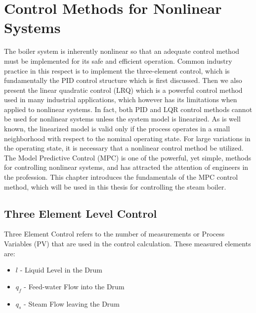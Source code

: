 \chapter{Control Methods for Nonlinear Systems}
    The boiler system is inherently nonlinear so that an adequate control method must be implemented for its safe and efficient operation.
    Common industry practice in this respect is to implement the three-element control, which is fundamentally the PID control structure which is first discussed. Then we also present the linear quadratic control (LRQ) which is a powerful control method used in many industrial applications, which however has its limitations when applied to nonlinear systems. In fact, both PID and LQR control methods cannot be used for nonlinear systems unless the system model is linearized. As is well known, the linearized model is valid only if the process operates in a small neighborhood with respect to the nominal operating state. For large variations in the operating state, it is necessary that a nonlinear control method be utilized. The Model Predictive Control (MPC) is one of the powerful, yet simple, methods for controlling nonlinear systems, and has attracted the attention of engineers in the profession. This chapter introduces the fundamentals of the MPC control method, which will be used in this thesis for controlling the steam boiler.

    \section{Three Element Level Control}
        Three Element Control refers to the number of measurements or Process Variables (PV) that are used in the control calculation. These measured elements are:
        
        \begin{itemize}
          \item $l$ - Liquid Level in the Drum
          \item $q_f$ - Feed-water Flow into the Drum
          \item $q_s$ - Steam Flow leaving the Drum 
        \end{itemize}
        
